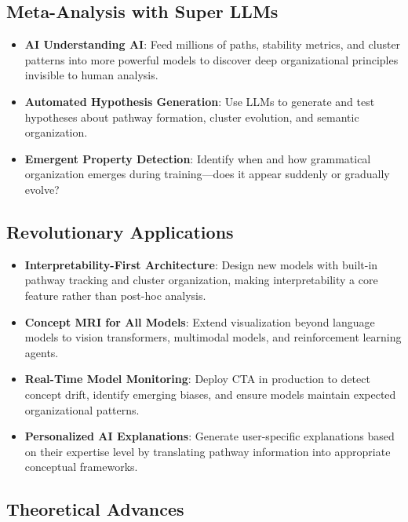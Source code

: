 \subsection{Meta-Analysis with Super LLMs}

\begin{itemize}
    \item \textbf{AI Understanding AI}: Feed millions of paths, stability metrics, and cluster patterns into more powerful models to discover deep organizational principles invisible to human analysis.
    
    \item \textbf{Automated Hypothesis Generation}: Use LLMs to generate and test hypotheses about pathway formation, cluster evolution, and semantic organization.
    
    \item \textbf{Emergent Property Detection}: Identify when and how grammatical organization emerges during training—does it appear suddenly or gradually evolve?
\end{itemize}

\subsection{Revolutionary Applications}

\begin{itemize}
    \item \textbf{Interpretability-First Architecture}: Design new models with built-in pathway tracking and cluster organization, making interpretability a core feature rather than post-hoc analysis.
    
    \item \textbf{Concept MRI for All Models}: Extend visualization beyond language models to vision transformers, multimodal models, and reinforcement learning agents.
    
    \item \textbf{Real-Time Model Monitoring}: Deploy CTA in production to detect concept drift, identify emerging biases, and ensure models maintain expected organizational patterns.
    
    \item \textbf{Personalized AI Explanations}: Generate user-specific explanations based on their expertise level by translating pathway information into appropriate conceptual frameworks.
\end{itemize}

\subsection{Theoretical Advances}

